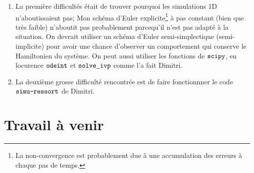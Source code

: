 \documentclass[
  french,
	11pt, %
]{fphw}
\begin{document}
\begin{enumerate}
  \item La première difficultés était de trouver pourquoi les simulations 1D n'aboutissaient pas; Mon schéma d'Euler explicite\footnote{La non-convergence est probablement due à une accumulation des erreurs à chaque pas de temps.} à pas constant (bien que très faible) n'aboutit pas probablement parcequ'il n'est pas adapté à la situation. On devrait utiliser un schéma d'Euler semi-simplectique (semi-implicite) pour avoir une chance d'observer un comportement qui conserve le Hamiltonien du système. On peut aussi utiliser les fonctions de $\verb|scipy|$, en locurence $\verb|odeint|$ et $\verb|solve_ivp|$ comme l'a fait Dimitri.
  \item La deuxième grosse difficulté rencontrée est de faire fonctionnner le code $\verb|simu-ressort|$ de Dimitri.
\end{enumerate}



\section*{Travail à venir}
\end{document}
